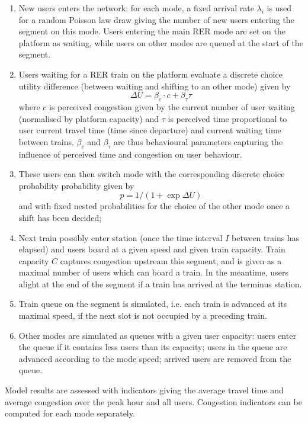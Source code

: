 \documentclass[3p,times,procedia]{elsarticle}
\begin{document}
\begin{enumerate}
	\item New users enters the network: for each mode, a fixed arrival rate $\lambda_i$ is used for a random Poisson law draw giving the number of new users entering the segment on this mode. Users entering the main RER mode are set on the platform as waiting, while users on other modes are queued at the start of the segment.
	\item Users waiting for a RER train on the platform evaluate a discrete choice utility difference (between waiting and shifting to an other mode) given by 
	\begin{equation} 
	\Delta U = \beta_c \cdot c + \beta_{\tau} \tau
	\end{equation}
	where $c$ is perceived congestion given by the current number of user waiting (normalised by platform capacity) and $\tau$ is perceived time proportional to user current travel time (time since departure) and current waiting time between trains. $\beta_c$ and $\beta_{\tau}$ are thus behavioural parameters capturing the influence of perceived time and congestion on user behaviour.
	\item These users can then switch mode with the corresponding discrete choice probability probability given by 
	\begin{equation}
	p = 1 / (1 + \exp \Delta U)
	\end{equation}
	and with fixed nested probabilities for the choice of the other mode once a shift has been decided;
	\item Next train possibly enter station (once the time interval $I$ between trains has elapsed) and users board at a given speed and given train capacity. Train capacity $C$ captures congestion upstream this segment, and is given as a maximal number of users which can board a train. In the meantime, users alight at the end of the segment if a train has arrived at the terminus station.
	\item Train queue on the segment is simulated, i.e. each train is advanced at its maximal speed, if the next slot is not occupied by a preceding train.
	\item Other modes are simulated as queues with a given user capacity: users enter the queue if it contains less users than its capacity; users in the queue are advanced according to the mode speed; arrived users are removed from the queue.
\end{enumerate}

Model results are assessed with indicators giving the average travel time and average congestion over the peak hour and all users. Congestion indicators can be computed for each mode separately.
\end{document}
